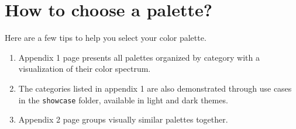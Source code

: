 \documentclass{tutodoc}
\begin{document}
\section{How to choose a palette?}

Here are a few tips to help you select your color palette.
%
\begin{enumerate}
   \item Appendix 1 page \pageref{all-palettes} presents all palettes organized by category with a visualization of their color spectrum.
   
   \item The categories listed in appendix 1 are also demonstrated through use cases in the \texttt{showcase} folder, available in light and dark themes.

   \item Appendix 2 page \pageref{similar-palettes} groups visually similar palettes together.
\end{enumerate}
\end{document}
